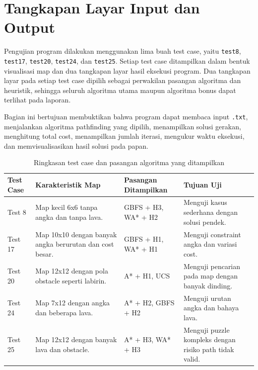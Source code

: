 \section{Tangkapan Layar Input dan Output}

Pengujian program dilakukan menggunakan lima buah test case, yaitu \texttt{test8}, \texttt{test17}, \texttt{test20}, \texttt{test24}, dan \texttt{test25}. 
Setiap test case ditampilkan dalam bentuk visualisasi map dan dua tangkapan layar hasil eksekusi program. 
Dua tangkapan layar pada setiap test case dipilih sebagai perwakilan pasangan algoritma dan heuristik, sehingga seluruh algoritma utama maupun algoritma bonus dapat terlihat pada laporan.

\begin{tcolorbox}[
	colback=blue!5,
	colframe=blue!60!black,
	title=\textbf{Tujuan Pengujian Bagian Ini},
	arc=2mm,
	boxrule=0.8pt
]
Bagian ini bertujuan membuktikan bahwa program dapat membaca input \texttt{.txt}, menjalankan algoritma pathfinding yang dipilih, menampilkan solusi gerakan, menghitung total cost, menampilkan jumlah iterasi, mengukur waktu eksekusi, dan memvisualisasikan hasil solusi pada papan.
\end{tcolorbox}

\begin{table}[H]
	\centering
	\caption{Ringkasan test case dan pasangan algoritma yang ditampilkan}
	\begin{tabular}{|p{2.2cm}|p{4.5cm}|p{4cm}|p{3cm}|}
		\hline
		\rowcolor{blue!15}
		\textbf{Test Case} & \textbf{Karakteristik Map} & \textbf{Pasangan Ditampilkan} & \textbf{Tujuan Uji} \\
		\hline
		Test 8 & Map kecil 6x6 tanpa angka dan tanpa lava. & GBFS + H3, WA* + H2 & Menguji kasus sederhana dengan solusi pendek. \\
		\hline
		Test 17 & Map 10x10 dengan banyak angka berurutan dan cost besar. & GBFS + H1, WA* + H1 & Menguji constraint angka dan variasi cost. \\
		\hline
		Test 20 & Map 12x12 dengan pola obstacle seperti labirin. & A* + H1, UCS & Menguji pencarian pada map dengan banyak dinding. \\
		\hline
		Test 24 & Map 7x12 dengan angka dan beberapa lava. & A* + H2, GBFS + H2 & Menguji urutan angka dan bahaya lava. \\
		\hline
		Test 25 & Map 12x12 dengan banyak lava dan obstacle. & A* + H3, WA* + H3 & Menguji puzzle kompleks dengan risiko path tidak valid. \\
		\hline
	\end{tabular}
\end{table}

